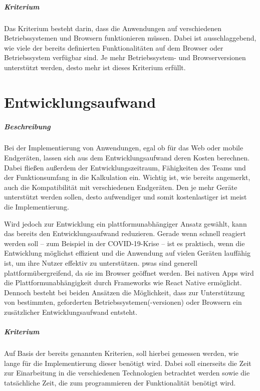 \subparagraph{Kriterium}
Das Kriterium besteht darin, dass die Anwendungen auf verschiedenen Betriebssystemen und Browsern funktionieren müssen.
Dabei ist ausschlaggebend, wie viele der bereits definierten Funktionalitäten auf dem Browser oder Betriebssystem verfügbar sind.
Je mehr Betriebssystem- und Browserversionen unterstützt werden, desto mehr ist dieses Kriterium erfüllt.

\section{Entwicklungsaufwand}
\subparagraph{Beschreibung\\}
Bei der Implementierung von Anwendungen, egal ob für das Web oder mobile Endgeräten, lassen sich aus dem Entwicklungsaufwand deren Kosten berechnen.
Dabei fließen außerdem der Entwicklungszeitraum, Fähigkeiten des Teams und der Funktionsumfang in die Kalkulation ein.
Wichtig ist, wie bereits angemerkt, auch die Kompatibilität mit verschiedenen Endgeräten.
Den je mehr Geräte unterstützt werden sollen, desto aufwendiger und somit kostenlastiger ist meist die Implementierung.

Wird jedoch zur Entwicklung ein plattformunabhängiger Ansatz gewählt, kann das bereits den Entwicklungsaufwand reduzieren.
Gerade wenn schnell reagiert werden soll -- zum Beispiel in der COVID-19-Krise -- ist es praktisch, wenn die Entwicklung möglichst effizient und die Anwendung auf vielen Geräten lauffähig ist, um ihre Nutzer effektiv zu unterstützen.
\acp{pwa} sind generell plattformübergreifend, da sie im Browser geöffnet werden.
Bei nativen Apps wird die Plattformunabhängigkeit durch Frameworks wie React Native ermöglicht.
Dennoch besteht bei beiden Ansätzen die Möglichkeit, dass zur Unterstützung von bestimmten, geforderten Betriebssystemen(-versionen) oder Browsern ein zusätzlicher Entwicklungsaufwand entsteht.

\subparagraph{Kriterium\\}
Auf Basis der bereits genannten Kriterien, soll hierbei gemessen werden, wie lange für die Implementierung dieser benötigt wird.
Dabei soll einerseits die Zeit zur Einarbeitung in die verschiedenen Technologien betrachtet werden sowie die tatsächliche Zeit, die zum programmieren der Funktionalität benötigt wird.